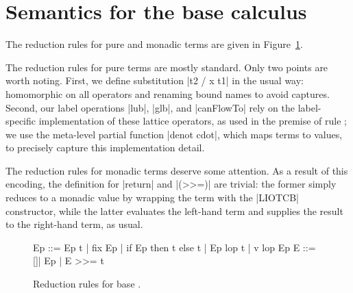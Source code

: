 \appendices
\section{Semantics for the base calculus}

The reduction rules for pure and monadic terms are given in
Figure~\ref{fig:sos:rules}.

%
The reduction rules for pure terms are mostly standard.
%
Only two points are worth noting.
%
First, we define substitution |{t2 / x } t1| in the usual way:
homomorphic on all operators and renaming bound names to avoid
captures. 
%
Second, our label operations |lub|, |glb|, and |canFlowTo| rely on the
label-specific implementation of these lattice operators, as used in
the premise of rule ;
%
we use the meta-level partial function |denot cdot|, which maps terms
to values, to precisely capture this implementation detail.

%
The reduction rules for monadic terms deserve some attention.
%
As a result of this encoding, the definition for |return| and |(>>=)|
are trivial: the former simply reduces to a monadic value by wrapping
the term with the |LIOTCB| constructor, while the latter evaluates the
left-hand term and supplies the result to the right-hand term, as
usual.


\begin{figure}[t] %
\small
\begin{code}
Ep  ::= Ep t | fix Ep | if Ep then t else t | Ep lop t | v lop Ep
E   ::= []| Ep | E >>= t 
\end{code}

\caption{Reduction rules for base \lio.\label{fig:sos:rules}}
\end{figure}
